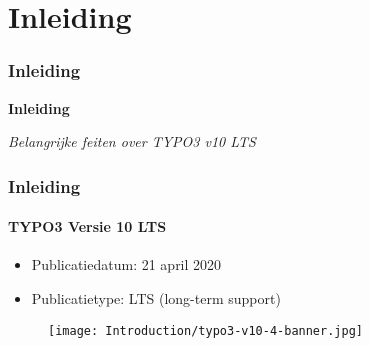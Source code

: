 %

\section{Inleiding}
\begin{frame}[fragile]
	\frametitle{Inleiding}

	\begin{center}\huge{\color{typo3darkgrey}\textbf{Inleiding}}\end{center}
	\begin{center}\large{\textit{Belangrijke feiten over TYPO3 v10 LTS}}\end{center}

\end{frame}


\begin{frame}[fragile]
	\frametitle{Inleiding}
	\framesubtitle{TYPO3 Versie 10 LTS}

	\begin{itemize}
		\item Publicatiedatum: 21 april 2020
		\item Publicatietype: LTS (long-term support)
	\end{itemize}

	\begin{figure}
		\texttt{[image: Introduction/typo3-v10-4-banner.jpg]}
	\end{figure}

\end{frame}


